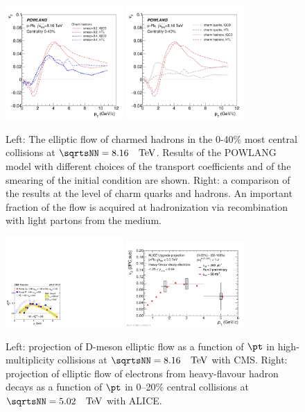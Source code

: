 \begin{figure}[ht]
\centering
\includegraphics[width=0.4\textwidth]{hf/figures/v2cD_pPb8TeV_smear.pdf}
\includegraphics[width=0.4\textwidth]{hf/figures/v2cD_pPb8TeV_HTLvslQCD.pdf}
\caption{
Left: The elliptic flow of charmed hadrons in the 0-40\% most central \pPb collisions at $\sqrtsNN=8.16$~$~\text{TeV}$. Results of the POWLANG model with different choices of the transport coefficients and of the smearing of the initial condition are shown. 
Right: a comparison of the results at the level of charm quarks and hadrons. An important fraction of the flow is acquired at hadronization via recombination with light partons from the medium.}
\label{fig:POWLANG-small2}
\end{figure}
\begin{figure}[ht]
\centering
\includegraphics[width=0.4\textwidth]{hf/figures/CMS_Dv2.pdf}
\includegraphics[width=0.4\textwidth]{hf/figures/2017-Oct-30-HFev2Plot.pdf}
\caption{
Left: projection of D-meson elliptic flow as a function of $\pt$ in high-multiplicity \pPb collisions at $\sqrtsNN=8.16$~$~\text{TeV}$ with CMS.
Right: projection of elliptic flow of electrons from heavy-flavour hadron decays as a function of $\pt$ in 0--20\% central \pPb collisions at $\sqrtsNN=5.02$~$~\text{TeV}$ with ALICE.}
\label{fig:elliptic-data}
\end{figure}
